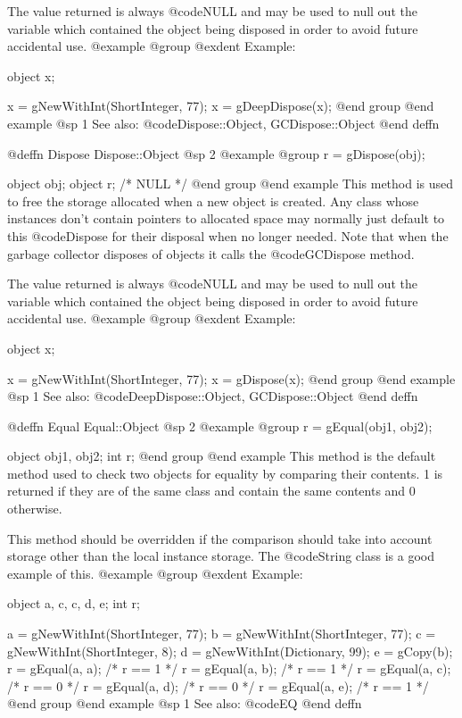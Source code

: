 The value returned is always @code{NULL} and may be used to null out
the variable which contained the object being disposed in order to
avoid future accidental use.
@example
@group
@exdent Example:

object  x;

x = gNewWithInt(ShortInteger, 77);
x = gDeepDispose(x);
@end group
@end example
@sp 1
See also:  @code{Dispose::Object, GCDispose::Object}
@end deffn





@deffn {Dispose} Dispose::Object
@sp 2
@example
@group
r = gDispose(obj);

object  obj;
object  r;     /*  NULL  */
@end group
@end example
This method is used to free the storage allocated when a new object is
created.  Any class whose instances don't contain pointers to allocated
space may normally just default to this @code{Dispose} for their
disposal when no longer needed.  Note that when the garbage collector
disposes of objects it calls the @code{GCDispose} method.

The value returned is always @code{NULL} and may be used to null out
the variable which contained the object being disposed in order to
avoid future accidental use.
@example
@group
@exdent Example:

object  x;

x = gNewWithInt(ShortInteger, 77);
x = gDispose(x);
@end group
@end example
@sp 1
See also:  @code{DeepDispose::Object, GCDispose::Object}
@end deffn











@deffn {Equal} Equal::Object
@sp 2
@example
@group
r = gEqual(obj1, obj2);

object  obj1, obj2;
int     r;
@end group
@end example
This method is the default method used to check two objects for equality
by comparing their contents.  1 is returned if they are of the same
class and contain the same contents and 0 otherwise.

This method should be overridden if the comparison should take
into account storage other than the local instance storage.  The
@code{String} class is a good example of this.
@example
@group
@exdent Example:

object  a, c, c, d, e;
int     r;

a = gNewWithInt(ShortInteger, 77);
b = gNewWithInt(ShortInteger, 77);
c = gNewWithInt(ShortInteger, 8);
d = gNewWithInt(Dictionary, 99);
e = gCopy(b);
r = gEqual(a, a);   /*  r == 1  */
r = gEqual(a, b);   /*  r == 1  */
r = gEqual(a, c);   /*  r == 0  */
r = gEqual(a, d);   /*  r == 0  */
r = gEqual(a, e);   /*  r == 1  */
@end group
@end example
@sp 1
See also:  @code{EQ}
@end deffn










